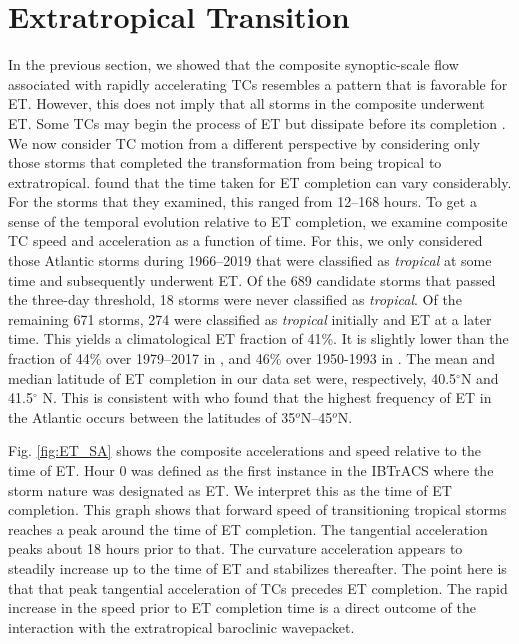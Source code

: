 \documentclass[wcd,manuscript]{copernicus}
\begin{document}
\section{Extratropical Transition}
In the previous section, we showed that the composite synoptic-scale flow associated with rapidly accelerating TCs resembles a pattern that is favorable for ET.  However, this does not  imply that all storms in the composite underwent ET. Some TCs may begin the process of ET but dissipate before its completion \citep[e.g.,][]{KRT2010A}. We now consider TC motion from a different perspective by considering only those storms that completed the transformation from being tropical to extratropical.  \cite{HE2006} found that the time taken for ET completion can vary considerably. For the storms that they examined, this ranged from 12--168 hours. To get a sense of the temporal evolution relative to ET completion, we examine composite TC speed and acceleration as a function of time. For this, we only considered those Atlantic storms during 1966--2019 that were classified as \emph{tropical} at some time and subsequently underwent ET. Of the 689 candidate storms that passed the three-day threshold, 18 storms were never classified as \emph{tropical}. Of the remaining 671 storms, 274 were classified as \emph{tropical} initially and ET at a later time. This yields a climatological ET fraction of 41\%. It is slightly lower than the fraction of 44\% over 1979--2017 in \cite{BCSEH2019a}, and 46\% over 1950-1993 in  \cite{HE2001}.  The mean and median latitude of ET completion in our data set were, respectively, 40.5$^\circ$N and 41.5$^\circ$ N. This is consistent with \cite{HE2001} who found that the highest frequency of ET in the Atlantic occurs between the latitudes of 35$^o$N--45$^o$N.



Fig. \ref{fig:ET_SA} shows the composite accelerations and speed relative to the time of ET. Hour 0 was defined as the first instance in the IBTrACS where the storm nature was designated as ET. We interpret this as the time of ET completion. This graph shows that forward speed of transitioning tropical storms reaches a peak around the time of ET completion. The tangential acceleration peaks about 18 hours prior to that. The curvature acceleration appears to steadily increase up to the time of ET and stabilizes thereafter. The point here is that that peak  tangential acceleration of TCs precedes ET completion. The rapid increase in the speed prior to ET completion time is a direct outcome of the interaction with the extratropical baroclinic wavepacket. 
\end{document}
